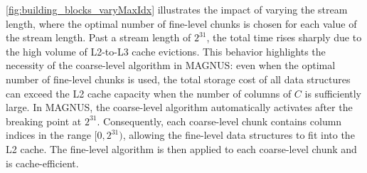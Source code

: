 \autoref{fig:building_blocks_varyMaxIdx} illustrates the impact of varying the stream length, where the optimal number of fine-level chunks is chosen for each value of the stream length.
Past a stream length of $2^{31}$, the total time rises sharply due to the high volume of L2-to-L3 cache evictions.
This behavior highlights the necessity of the coarse-level algorithm in MAGNUS: even when the optimal number of fine-level chunks is used, the total storage cost of all data structures can exceed the L2 cache capacity when the number of columns of $C$ is sufficiently large.
In MAGNUS, the coarse-level algorithm automatically activates after the breaking point at $2^{31}$.
Consequently, each coarse-level chunk contains column indices in the range $[0, 2^{31})$, allowing the fine-level data structures to fit into the L2 cache.
The fine-level algorithm is then applied to each coarse-level chunk and is cache-efficient.


